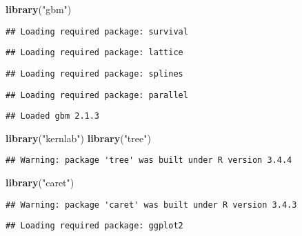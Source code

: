 \documentclass[]{article}
\newenvironment{Shaded}{\begin{snugshade}}{\end{snugshade}}
\newcommand{\KeywordTok}[1]{\textcolor[rgb]{0.13,0.29,0.53}{\textbf{#1}}}
\newcommand{\StringTok}[1]{\textcolor[rgb]{0.31,0.60,0.02}{#1}}
\newcommand{\NormalTok}[1]{#1}
\begin{document}
\begin{Shaded}
\begin{Highlighting}[]
\KeywordTok{library}\NormalTok{(}\StringTok{"gbm"}\NormalTok{)}
\end{Highlighting}
\end{Shaded}

\begin{verbatim}
## Loading required package: survival
\end{verbatim}

\begin{verbatim}
## Loading required package: lattice
\end{verbatim}

\begin{verbatim}
## Loading required package: splines
\end{verbatim}

\begin{verbatim}
## Loading required package: parallel
\end{verbatim}

\begin{verbatim}
## Loaded gbm 2.1.3
\end{verbatim}

\begin{Shaded}
\begin{Highlighting}[]
\KeywordTok{library}\NormalTok{(}\StringTok{"kernlab"}\NormalTok{)}
\KeywordTok{library}\NormalTok{(}\StringTok{"tree"}\NormalTok{)}
\end{Highlighting}
\end{Shaded}

\begin{verbatim}
## Warning: package 'tree' was built under R version 3.4.4
\end{verbatim}

\begin{Shaded}
\begin{Highlighting}[]
\KeywordTok{library}\NormalTok{(}\StringTok{"caret"}\NormalTok{)}
\end{Highlighting}
\end{Shaded}

\begin{verbatim}
## Warning: package 'caret' was built under R version 3.4.3
\end{verbatim}

\begin{verbatim}
## Loading required package: ggplot2
\end{verbatim}
\end{document}
